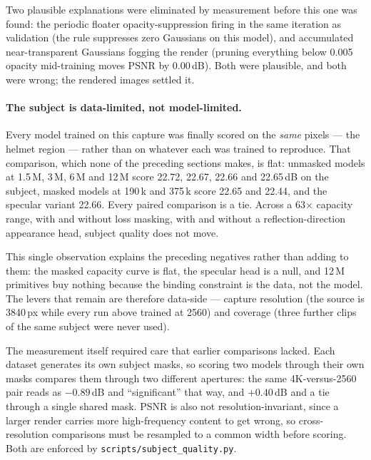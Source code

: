Two plausible explanations were eliminated by measurement before this one was found: the
periodic floater opacity-suppression firing in the same iteration as validation (the rule
suppresses zero Gaussians on this model), and accumulated near-transparent Gaussians fogging
the render (pruning everything below 0.005 opacity mid-training moves PSNR by 0.00\,dB).
Both were plausible, and both were wrong; the rendered images settled it.

\paragraph{The subject is data-limited, not model-limited.}
Every model trained on this capture was finally scored on the \emph{same} pixels --- the
helmet region --- rather than on whatever each was trained to reproduce. That comparison,
which none of the preceding sections makes, is flat: unmasked models at 1.5\,M, 3\,M, 6\,M
and 12\,M score 22.72, 22.67, 22.66 and 22.65\,dB on the subject, masked models at 190\,k and
375\,k score 22.65 and 22.44, and the specular variant 22.66. Every paired comparison is a
tie. Across a 63$\times$ capacity range, with and without loss masking, with and without a
reflection-direction appearance head, subject quality does not move.

This single observation explains the preceding negatives rather than adding to them: the
masked capacity curve is flat, the specular head is a null, and 12\,M primitives buy nothing
because the binding constraint is the data, not the model. The levers that remain are
therefore data-side --- capture resolution (the source is 3840\,px while every run above
trained at 2560) and coverage (three further clips of the same subject were never used).

The measurement itself required care that earlier comparisons lacked. Each dataset generates
its own subject masks, so scoring two models through their own masks compares them through
two different apertures: the same 4K-versus-2560 pair reads as $-0.89$\,dB and
``significant'' that way, and $+0.40$\,dB and a tie through a single shared mask. PSNR is
also not resolution-invariant, since a larger render carries more high-frequency content to
get wrong, so cross-resolution comparisons must be resampled to a common width before
scoring. Both are enforced by \texttt{scripts/subject\_quality.py}.
